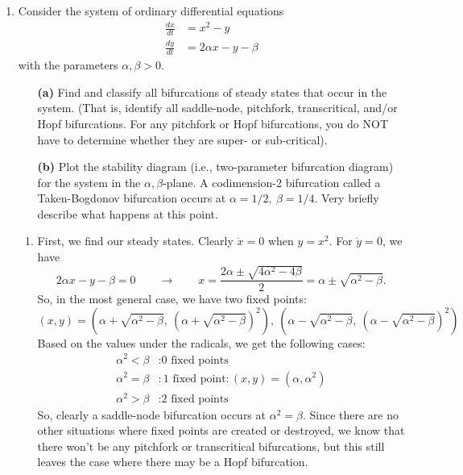 \documentclass[10pt,letterpaper]{report}
\newcommand{\so}{\qquad \rightarrow \qquad}
\begin{document}
\begin{enumerate}
\item \begin{qbox}
Consider the system of ordinary differential equations
\begin{align*}
    \frac{dx}{dt} &= x^2 - y
    \\
    \frac{dy}{dt} &= 2\alpha x - y - \beta
\end{align*}
with the parameters $\alpha, \beta > 0$.
\begin{itemize}
    \item[\textbf{(a)}] Find and classify all bifurcations of steady states that occur in the system. (That is, identify all saddle-node, pitchfork, transcritical, and/or Hopf bifurcations. For any pitchfork or Hopf bifurcations, you do NOT have to determine whether they are super- or sub-critical).
    
    \item[\textbf{(b)}] Plot the stability diagram (i.e., two-parameter bifurcation diagram) for the system in the $\alpha,\beta$-plane. A codimension-2 bifurcation called a Taken-Bogdonov bifurcation occurs at $\alpha = 1/2,\ \beta = 1/4$. Very briefly describe what happens at this point.
\end{itemize}
\end{qbox}
\begin{enumerate}
    \item First, we find our steady states. Clearly $\dot x = 0$ when $y = x^2$. For $\dot y = 0$, we have
    \[
    2\alpha x - y - \beta = 0 \so x = \frac{2\alpha \pm \sqrt{4\alpha^2-4\beta}}{2} = \alpha \pm \sqrt{\alpha^2 - \beta}.
    \]
    So, in the most general case, we have two fixed points:
    \[
    (x, y) =
    \left(\alpha + \sqrt{\alpha^2 - \beta},\ \left(\alpha + \sqrt{\alpha^2 - \beta}\right)^2\right),\ 
    \left(\alpha - \sqrt{\alpha^2 - \beta},\ \left(\alpha - \sqrt{\alpha^2 - \beta}\right)^2\right)
    \]
    Based on the values under the radicals, we get the following cases:
    \begin{align*}
        \alpha^2 < \beta &: \textrm{0 fixed points}
        \\
        \alpha^2 = \beta &: \textrm{1 fixed point}: (x, y) = (\alpha, \alpha^2)
        \\
        \alpha^2 > \beta &: \textrm{2 fixed points}
    \end{align*}
    So, clearly a saddle-node bifurcation occurs at $\alpha^2 = \beta$. Since there are no other situations where fixed points are created or destroyed, we know that there won't be any pitchfork or transcritical bifurcations, but this still leaves the case where there may be a Hopf bifurcation.
    

\end{enumerate}
\end{enumerate}
\end{document}
